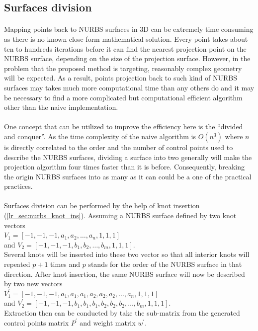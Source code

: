 \subsection{Surfaces division}
\label{oct_sc:surface_division}
\paragraph{}
Mapping points back to NURBS surfaces in 3D can be extremely time consuming as there is no known close form mathematical solution.
Every point takes about ten to hundreds iterations before it can find the nearest projection point on the NURBS surface, depending on the size of the projection surface.
However, in the problem that the proposed method is targeting, reasonably complex geometry will be expected.
As a result, points projection back to such kind of NURBS surfaces may takes much more computational time than any others do and it may be necessary to find a more complicated but computational efficient algorithm other than the naive implementation.

\paragraph{}
One concept that can be utilized to improve the efficiency here is the ``divided and conquer''.
As the time complexity of the naive algorithm is $O(n^3)$ where $n$ is directly correlated to the order and the number of control points used to describe the NURBS surfaces, dividing a surface into two generally will make the projection algorithm four times faster than it is before.
Consequently, breaking the origin NURBS surfaces into as many as it can could be a one of the practical practices.

\paragraph{}
Surfaces division can be performed by the help of knot insertion (\ref{lr_sec:nurbs_knot_ins}).
Assuming a NURBS surface defined by two knot vectors\\
$
V_1 = [-1, -1, -1, a_1, a_2, \dots, a_n , 1, 1, 1]
$\\
and
$
V_2 = [-1, -1, -1, b_1, b_2, \dots, b_m, 1, 1, 1]
$.\\
Several knots will be inserted into these two vector so that all interior knots will repeated $p+1$ times and $p$ stands for the order of the NURBS surface in that direction.
After knot insertion, the same NURBS surface will now be described by two new vectors\\
$
V_1^\prime = [-1, -1, -1, a_1, a_1, a_1, a_2, a_2, a_2, \dots, a_n , 1, 1, 1]
$\\
and
$
V_2^\prime = [-1, -1, -1, b_1, b_1, b_1, b_2, b_2, b_2, \dots, b_m, 1, 1, 1]
$.\\
Extraction then can be conducted by take the sub-matrix from the generated control points matrix $P^\prime$ and weight matrix $w^\prime$.

